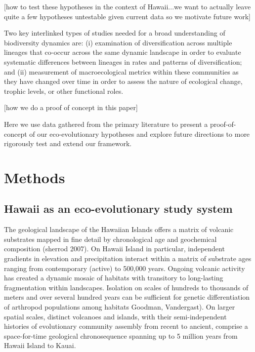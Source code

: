 \documentclass[12pt]{article}
\begin{document}


[how to test these hypotheses in the context of Hawaii...we want to
actually leave quite a few hypotheses untestable given current data so
we motivate future work]

Two key interlinked types of studies needed for a broad understanding
of biodiversity dynamics are: (i) examination of diversification
across multiple lineages that co-occur across the same dynamic
landscape in order to evaluate systematic differences between lineages
in rates and patterns of diversification; and (ii) measurement of
macroecological metrics within these communities as they have changed
over time in order to assess the nature of ecological change, trophic
levels, or other functional roles.

[how we do a proof of concept in this paper]

Here we use data gathered from the primary literature to present a
proof-of-concept of our eco-evolutionary hypotheses and explore future
directions to more rigorously test and extend our framework.


\section*{Methods}

\subsection*{Hawaii as an eco-evolutionary study system}
The geological landscape of the Hawaiian Islands offers a matrix of
volcanic substrates mapped in fine detail by chronological age and
geochemical composition (sherrod 2007). On Hawaii Island in
particular, independent gradients in elevation and precipitation
interact within a matrix of substrate ages ranging from contemporary
(active) to 500,000 years. Ongoing volcanic activity has created a
dynamic mosaic of habitats with transitory to long-lasting
fragmentation within landscapes. Isolation on scales of hundreds to
thousands of meters and over several hundred years can be sufficient
for genetic differentiation of arthropod populations among habitats
Goodman, Vandergast). On larger spatial scales, distinct
volcanoes and islands, with their semi-independent histories of
evolutionary community assembly from recent to ancient, comprise a
space-for-time geological chronosequence spanning up to 5 million
years from Hawaii Island to Kauai.
\end{document}
